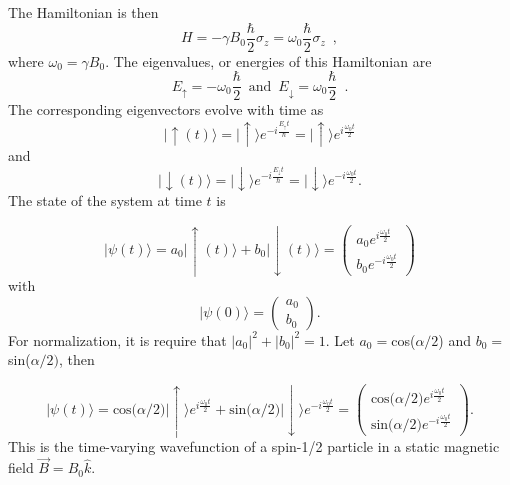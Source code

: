 %
The Hamiltonian is then
%
\begin{equation}
  \label{eqn:B0ham}
  H = -\gamma  B_{0} \frac{\hbar}{2}\sigma_{z} = \omega_{0}\frac{\hbar}{2}\sigma_{z} \,\,\, ,
\end{equation}
where $\omega_{0} = \gamma B_{0}$.  The eigenvalues, or energies of
this Hamiltonian are
\begin{equation}
  E_{\uparrow} = -\omega_{0} \frac{\hbar}{2} \,\,\, \textrm{and} \,\,\, E_{\downarrow} = \omega_{0} \frac{\hbar}{2} \,\,\, .
\end{equation}
The corresponding eigenvectors evolve with time as
\begin{equation}
  |\uparrow (t)\rangle = |\uparrow\rangle e^{ -i \frac{E_{\uparrow} t}{\hbar}} = |\uparrow\rangle e^{i \frac{\omega_{0}t}{2}}
\end{equation}
and
\begin{equation}
  |\downarrow (t)\rangle = |\downarrow\rangle e^{ -i \frac{E_{\downarrow} t}{\hbar}} = |\downarrow\rangle e^{-i \frac{\omega_{0}t}{2}}.
\end{equation}
%
The state of the system at time $t$ is

\begin{equation}
  |\psi(t)\rangle = a_{0}|\uparrow(t)\rangle + b_{0}|\downarrow(t)\rangle = \begin{pmatrix}
    a_{0} e^{i \frac{\omega_{0}t}{2}} \\
    b_{0}e^{-i \frac{\omega_{0}t}{2}}
     \end{pmatrix}
\end{equation}
with
\begin{equation}
\label{eqn:psi0}
|\psi(0)\rangle = \begin{pmatrix}
        a_{0} \\
        b_{0}
     \end{pmatrix}.
\end{equation}
%
For normalization, it is require that $|a_{0}|^{2}+|b_{0}|^2 = 1$.  Let
$a_{0} = $cos($\alpha /2$) and $b_{0} = $sin($\alpha /2)$, then

\begin{equation}
  \label{eqn:psi}
  |\psi(t)\rangle = \textrm{cos($\alpha$/2)}|\uparrow\rangle e^{i \frac{\omega_{0}t}{2}} + \textrm{sin($\alpha$/2)}|\downarrow\rangle e^{-i \frac{\omega_{0}t}{2}} = \begin{pmatrix}
    \textrm{cos($\alpha$/2)} e^{i \frac{\omega_{0}t}{2}} \\
    \textrm{sin($\alpha$/2)} e^{-i \frac{\omega_{0}t}{2}}
     \end{pmatrix}.
\end{equation}
This is the time-varying wavefunction of a
spin-1/2 particle in a static magnetic field $\vec{B} = B_{0}\hat{k}$.

